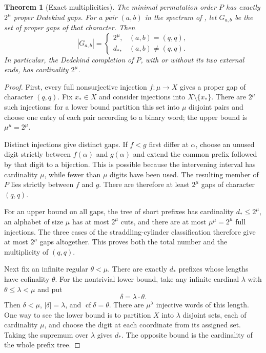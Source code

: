 \documentclass[11pt]{article}
\newtheorem{theorem}{Theorem}[section]
\theoremstyle{definition}
\theoremstyle{remark}
\begin{document}
\begin{theorem}[Exact multiplicities]\label{swo:sh:thm:gap-multiplicities}
The minimal permutation order $P$ has exactly $2^\mu$ proper
Dedekind gaps.  For a pair $(a,b)$ in the spectrum of
, let $G_{a,b}$ be the set of
proper gaps of that character.  Then
\[
\boxed{
|G_{a,b}|=\begin{cases}
2^\mu,&(a,b)=(q,q),\\
d_*,&(a,b)\ne(q,q).
\end{cases}}
\]
In particular, the Dedekind completion of $P$, with or without its
two external ends, has cardinality $2^\mu$.
\end{theorem}

\begin{proof}
First, every full nonsurjective injection $f:\mu\to X$ gives a
proper gap of character $(q,q)$.  Fix $x_*\in X$ and consider
injections into $X\setminus\{x_*\}$.  There are $2^\mu$ such
injections: for a lower bound partition this set into $\mu$ disjoint
pairs and choose one entry of each pair according to a binary word;
the upper bound is $\mu^\mu=2^\mu$.

Distinct injections give distinct gaps.  If $f<g$ first differ at
$\alpha$, choose an unused digit strictly between $f(\alpha)$ and
$g(\alpha)$ and extend the common prefix followed by that digit to
a bijection.  This is possible because the intervening interval has
cardinality $\mu$, while fewer than $\mu$ digits have been used.
The resulting member of $P$ lies strictly between $f$ and $g$.
There are therefore at least $2^\mu$ gaps of character
$(q,q)$.

For an upper bound on all gaps, the tree of short prefixes has
cardinality $d_*\le 2^\mu$, an alphabet of size $\mu$ has at most
$2^\mu$ cuts, and there are at most $\mu^\mu=2^\mu$ full injections.
The three cases of the straddling-cylinder classification therefore
give at most $2^\mu$ gaps altogether.  This proves both the total
number and the multiplicity of $(q,q)$.

Next fix an infinite regular $\theta<\mu$.  There are exactly $d_*$
prefixes whose lengths have cofinality $\theta$.  For the nontrivial
lower bound, take any infinite cardinal $\lambda$ with
$\theta\le\lambda<\mu$ and put
\[
\delta=\lambda\cdot\theta.
\]
Then $\delta<\mu$, $|\delta|=\lambda$, and
$\operatorname{cf}\delta=\theta$.  There are $\mu^\lambda$ injective
words of this length.  One way to see the lower bound is to partition
$X$ into $\lambda$ disjoint sets, each of cardinality $\mu$, and
choose the digit at each coordinate from its assigned set.  Taking
the supremum over $\lambda$ gives $d_*$.  The opposite bound is the
cardinality of the whole prefix tree.


\end{proof}
\end{document}
